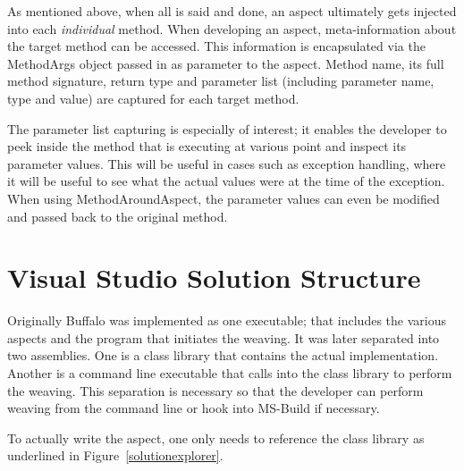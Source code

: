 As mentioned above, when all is said and done, an aspect ultimately gets injected into each \textit{individual} method. When developing an aspect, meta-information about the target method can be accessed. This information is encapsulated via the MethodArgs object passed in as parameter to the aspect. Method name, its full method signature, return type and parameter list (including parameter name, type and value) are captured for each target method.

The parameter list capturing is especially of interest; it enables the developer to peek inside the method that is executing at various point and inspect its parameter values. This will be useful in cases such as exception handling, where it will be useful to see what the actual values were at the time of the exception. When using MethodAroundAspect, the parameter values can even be modified and passed back to the original method.

\section{Visual Studio Solution Structure}

Originally Buffalo was implemented as one executable; that includes the various aspects and the program that initiates the weaving. It was later separated into two assemblies. One is a class library that contains the actual implementation. Another is a command line executable that calls into the class library to perform the weaving. This separation is necessary so that the developer can perform weaving from the command line or hook into MS-Build if necessary. 

To actually write the aspect, one only needs to reference the class library as underlined in Figure~\ref{solutionexplorer}.

